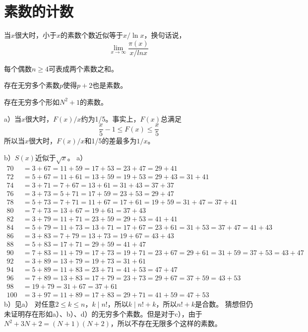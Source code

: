 \chapter{素数的计数}
\begin{theorem}[素数定理]
当$x$很大时，小于$x$的素数个数近似等于$x/\ln x$，换句话说，
\[\lim_{x\rightarrow\infty}\frac{\pi(x)}{x/ln x}\]
\end{theorem}
\begin{conjecture}[哥德巴赫猜想]
每个偶数$n\ge4$可表成两个素数之和。
\end{conjecture}
\begin{conjecture}[孪生素数猜想]
存在无穷多个素数$p$使得$p+2$也是素数。
\end{conjecture}
\begin{conjecture}[$N^2+1$猜想]
存在无穷多个形如$N^2+1$的素数。
\end{conjecture}
%
\exercise a）当$x$很大时，$F(x)/x$约为1/5。事实上，$F(x)$总满足
\[\frac{x}{5}-1\le F(x)\le\frac{x}{5}\]
所以当$x$很大时，$F(x)/x$和1/5的差最多为$1/x$。\par
b）$S(x)$近似于$\sqrt x$。
%
\exercise a）
\begin{align*}
70&=3+67=11+59=17+53=23+47=29+41 \\
72&=5+67=11+61=13+59=19+53=29+43=31+41 \\
74&=3+71=7+67=13+61=31+43=37+37 \\
76&=3+73=5+71=17+59=23+53=29+47 \\
78&=5+73=7+71=11+67=17+61=19+59=31+47=37+41 \\
80&=7+73=13+67=19+61=37+43 \\
82&=3+79=11+71=23+59=29+53=41+41 \\
84&=5+79=11+73=13+71=17+67=23+61=31+53=37+47=41+43 \\
86&=3+83=7+79=13+73=19+67=43+43 \\
88&=5+83=17+71=29+59=41+47 \\
90&=7+83=11+79=17+73=19+71=23+67=29+61=31+59=37+53=43+47 \\
92&=3+89=13+79=19+73=31+61 \\
94&=5+89=11+83=23+71=41+53=47+47 \\
96&=7+89=13+83=17+79=23+73=29+67=37+59=43+53 \\
98&=19+79=31+67=37+61 \\
100&=3+97=11+89=17+83=29+71=41+59=47+53 
\end{align*}
b）见a）
%
\exercise 对任意$2\le k\le n$，$k\mid n!$，所以$k\mid n!+k$，所以$n!+k$是合数。
%
\exercise 猜想但仍未证明存在形如a）、b）、d）的无穷多个素数。但是对于c），由于$N^2+3N+2=(N+1)(N+2)$，所以不存在无限多个这样的素数。
